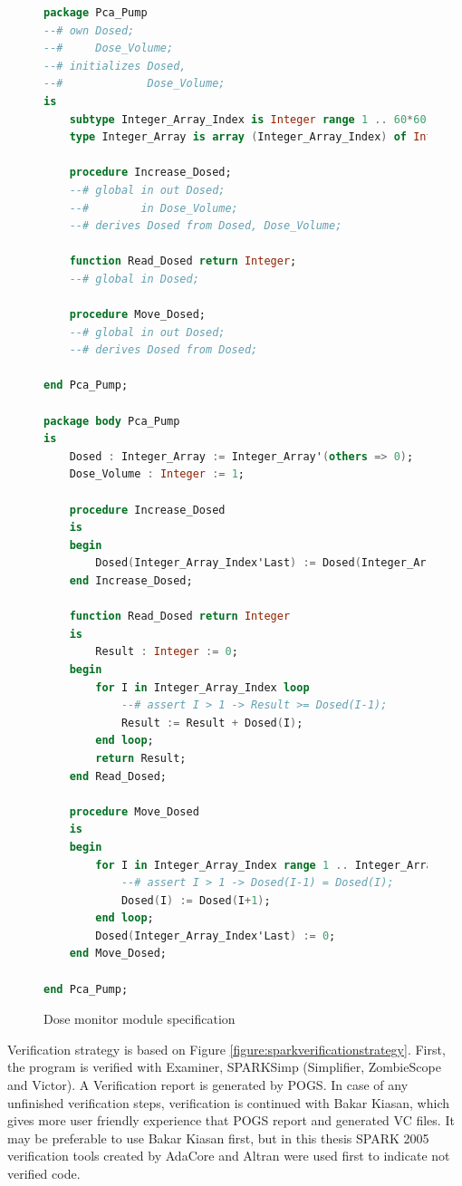 \begin{figure}
\singlespacing
\begin{lstlisting}[language=ada, frame=single, gobble=0]
package Pca_Pump
--# own Dosed;
--#     Dose_Volume;
--# initializes Dosed,
--#             Dose_Volume;
is
    subtype Integer_Array_Index is Integer range 1 .. 60*60;
    type Integer_Array is array (Integer_Array_Index) of Integer;

    procedure Increase_Dosed;
    --# global in out Dosed;
    --#        in Dose_Volume;
    --# derives Dosed from Dosed, Dose_Volume;

    function Read_Dosed return Integer;
    --# global in Dosed;

    procedure Move_Dosed;
    --# global in out Dosed;
    --# derives Dosed from Dosed;

end Pca_Pump;

package body Pca_Pump
is
    Dosed : Integer_Array := Integer_Array'(others => 0);
    Dose_Volume : Integer := 1;

    procedure Increase_Dosed
    is
    begin
        Dosed(Integer_Array_Index'Last) := Dosed(Integer_Array_Index'Last) + Dose_Volume;
    end Increase_Dosed;

    function Read_Dosed return Integer
    is
        Result : Integer := 0;
    begin
        for I in Integer_Array_Index loop
            --# assert I > 1 -> Result >= Dosed(I-1);
            Result := Result + Dosed(I);
        end loop;
        return Result;
    end Read_Dosed;

    procedure Move_Dosed
    is
    begin
        for I in Integer_Array_Index range 1 .. Integer_Array_Index'Last-1 loop
            --# assert I > 1 -> Dosed(I-1) = Dosed(I);
            Dosed(I) := Dosed(I+1);
        end loop;
        Dosed(Integer_Array_Index'Last) := 0;
    end Move_Dosed;

end Pca_Pump;
\end{lstlisting}
\doublespacing
\caption{Dose monitor module specification}
\label{listing:pcapump_dosemonitor}
\end{figure}

Verification strategy is based on Figure \ref{figure:sparkverificationstrategy}. First, the program is verified with Examiner, SPARKSimp (Simplifier, ZombieScope and Victor). A Verification report is generated by POGS. In case of any unfinished verification steps, verification is continued with Bakar Kiasan, which gives more user friendly experience that POGS report and generated VC files. It may be preferable to use Bakar Kiasan first, but in this thesis SPARK 2005 verification tools created by AdaCore and Altran were used first to indicate not verified code.

